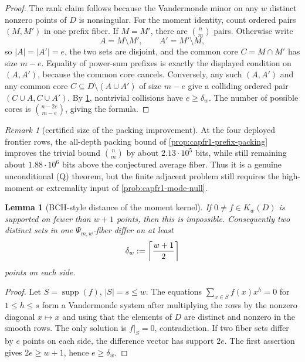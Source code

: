 \documentclass[11pt]{article}
\newtheorem{lemma}[lemma]{Lemma}
\theoremstyle{definition}
\theoremstyle{remark}
\newtheorem{remark}[remark]{Remark}
\begin{document}
\begin{proof}
The rank claim follows because the Vandermonde minor on any \(w\) distinct nonzero points of \(D\) is nonsingular.  For the moment identity, count ordered pairs \((M,M')\) in one prefix fiber.  If \(M=M'\), there are \(\binom n m\) pairs.  Otherwise write
\[
        A=M\setminus M',\qquad A'=M'\setminus M,
\]
so \(|A|=|A'|=e\), the two sets are disjoint, and the common core \(C=M\cap M'\) has size \(m-e\).  Equality of power-sum prefixes is exactly the displayed condition on \((A,A')\), because the common core cancels.  Conversely, any such \((A,A')\) and any common core \(C\subseteq D\setminus(A\cup A')\) of size \(m-e\) give a colliding ordered pair \((C\cup A,C\cup A')\).  By \cref{lem:capfr1-kernel-distance}, nontrivial collisions have \(e\ge\delta_w\).  The number of possible cores is \(\binom{n-2e}{m-e}\), giving the formula.
\end{proof}

\begin{remark}[certified size of the packing improvement]\label{rem:capfr1-packing-bits}
At the four deployed frontier rows, the all-depth packing bound of \cref{prop:capfr1-prefix-packing} improves the trivial bound \(\binom n m\) by about \(2.13\cdot10^5\) bits, while still remaining about \(1.88\cdot10^6\) bits above the conjectured average fiber.  Thus it is a genuine unconditional \textup{(Q)} theorem, but the finite adjacent problem still requires the high-moment or extremality input of \cref{prob:capfr1-mode-null}.
\end{remark}

\begin{lemma}[BCH-style distance of the moment kernel]\label{lem:capfr1-kernel-distance}
If \(0\ne f\in K_w(D)\) is supported on fewer than \(w+1\) points, then this is impossible.  Consequently two distinct sets in one \(\Psi_{m,w}\)-fiber differ on at least
\[
        \delta_w:=\left\lceil {w+1\over2}\right\rceil
\]
points on each side.
\end{lemma}

\begin{proof}
Let \(S=\operatorname{supp}(f)\), \(|S|=s\le w\).  The equations \(\sum_{x\in S}f(x)x^h=0\) for \(1\le h\le s\) form a Vandermonde system after multiplying the rows by the nonzero diagonal \(x\mapsto x\) and using that the elements of \(D\) are distinct and nonzero in the smooth rows.  The only solution is \(f|_S=0\), contradiction.  If two fiber sets differ by \(e\) points on each side, the difference vector has support \(2e\).  The first assertion gives \(2e\ge w+1\), hence \(e\ge\delta_w\).
\end{proof}
\end{document}
